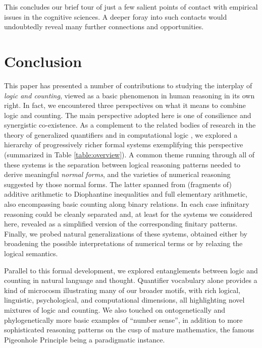 \documentclass[12pt,oneside,reqno]{amsart}
\theoremstyle{definition}
\begin{document}
This concludes our brief tour of just a few salient points of contact with empirical issues in the cognitive sciences. A deeper foray into such contacts would undoubtedly reveal many further connections and opportunities. 





\section{Conclusion}

This paper has presented a number of contributions to studying the interplay of \emph{logic and counting}, viewed as a basic phenomenon in human reasoning in its own right. In fact, we  encountered three perspectives on what it means to combine logic and counting. The main perspective  adopted here is one of consilience and synergistic co-existence. As a complement to the related bodies of research in the theory of generalized quantifiers \citep{BarwiseFeferman,PetersWesterstahl} and in computational logic \citep{Otto,Schweikardt}, we explored a hierarchy of  progressively richer formal systems exemplifying this perspective (summarized in Table \ref{table:overview}). A common theme running through all of these systems is the separation between logical reasoning patterns needed to derive meaningful \emph{normal forms}, and the varieties of numerical reasoning suggested by those normal forms.  The latter spanned from (fragments of) additive arithmetic to Diophantine inequalities and full elementary arithmetic, also encompassing basic counting along binary relations. In each case infinitary reasoning could be cleanly separated and, at least for the systems we considered here, revealed as a simplified version of the corresponding finitary patterns. Finally, we probed natural generalizations of these systems, obtained either by broadening the possible interpretations of numerical terms or by relaxing the logical semantics. 


Parallel to this formal development, we explored entanglements between logic and counting in natural language and thought. Quantifier vocabulary alone provides a kind of microcosm illustrating many of our broader motifs, with rich logical, linguistic, psychological, and computational dimensions, all highlighting novel mixtures of logic and counting. We also touched on ontogenetically and phylogenetically more basic examples of ``number sense'', in addition to more sophisticated reasoning patterns on the cusp of mature mathematics, the famous Pigeonhole Principle being a paradigmatic instance.
\end{document}
